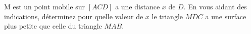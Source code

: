 %
%
    M est un point mobile sur \([ACD]\) a une distance \(x\) de \(D\). En vous aidant des indications, déterminez pour quelle valeur de \(x\) le triangle \(MDC\) a une surface plus petite que celle du triangle \(MAB\).

    
